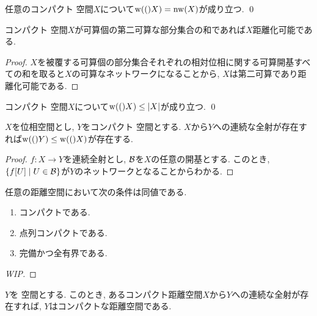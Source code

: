 \documentclass[uplatex, dvipdfmx, a4paper, 12pt, class=jsbook, crop=false]{standalone}
\begin{document}
\begin{corollary}
	\label{coro:Weight in a compact Hausdorff space is equal to network weight}
	任意のコンパクト  空間$ X $について$ \topweight(X) = \topnetwork(X) $が成り立つ.
	\qed
\end{corollary}

\begin{corollary}
	コンパクト  空間$ X $が可算個の第二可算な部分集合の和であれば$ X $距離化可能である.
\end{corollary}

\begin{proof}
	$ X $を被覆する可算個の部分集合それぞれの相対位相に関する可算開基すべての和を取ると$ X $の可算なネットワークになることから, $ X $は第二可算であり距離化可能である.
\end{proof}

\begin{corollary}
	コンパクト  空間$ X $について$ \topweight(X) \leq \cardinality{X} $が成り立つ.
	\qed
\end{corollary}

\begin{corollary}
	$ X $を位相空間とし, $ Y $をコンパクト  空間とする.
	$ X $から$ Y $への連続な全射が存在すれば$ \topweight(Y) \leq \topweight(X) $が存在する.
\end{corollary}

\begin{proof}
	$ f \colon X \to Y $を連続全射とし, $ \mathcal{B} $を$ X $の任意の開基とする.
	このとき, $ \setcomp{f[U]}{U \in \topbasis} $が$ Y $のネットワークとなることからわかる.
\end{proof}

\begin{proposition}
	任意の距離空間において次の条件は同値である.
	\begin{enumerate}
		\item コンパクトである.
		\item 点列コンパクトである.
		\item 完備かつ全有界である.
	\end{enumerate}
\end{proposition}

\begin{proof}
	[WIP]
\end{proof}

\begin{proposition}
	$ Y $を \Hausdorff 空間とする.
	このとき, あるコンパクト距離空間$ X $から$ Y $への連続な全射が存在すれば, $ Y $はコンパクトな距離空間である.
\end{proposition}
\end{document}
